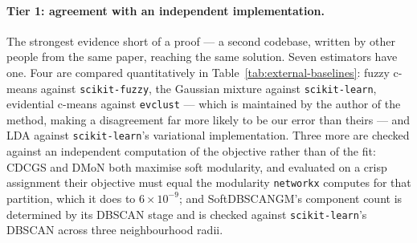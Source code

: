 \documentclass[twoside,11pt]{article}
\begin{document}
\paragraph{Tier 1: agreement with an independent implementation.}
The strongest evidence short of a proof --- a second codebase, written by
other people from the same paper, reaching the same solution. Seven
estimators have one. Four are compared quantitatively in
Table~\ref{tab:external-baselines}: fuzzy c-means against
\texttt{scikit-fuzzy}, the Gaussian mixture against \texttt{scikit-learn},
evidential c-means against \texttt{evclust} --- which is maintained by the
author of the method, making a disagreement far more likely to be our error
than theirs --- and LDA against \texttt{scikit-learn}'s variational
implementation. Three more are checked against an independent computation of
the objective rather than of the fit: CDCGS and DMoN both maximise soft
modularity, and evaluated on a crisp assignment their objective must equal
the modularity \texttt{networkx} computes for that partition, which it does
to $6\times10^{-9}$; and SoftDBSCANGM's component count is determined by its
DBSCAN stage and is checked against \texttt{scikit-learn}'s DBSCAN across
three neighbourhood radii.
\end{document}
